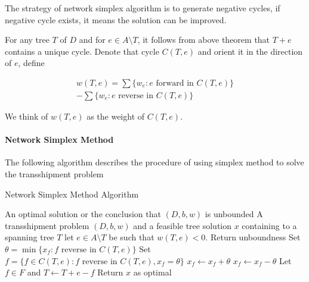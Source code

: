                 The strategy of network simplex algorithm is to generate negative cycles, if negative cycle exists, it means the solution can be improved.

                For any tree $T$ of $D$ and for $e\in A\setminus T$, it follows from above theorem that $T+e$ contains a unique cycle. Denote that cycle $C(T, e)$ and orient it in the direction of $e$, define 

                \begin{eqnarray}
                    w(T, e) = \sum\{w_e: e \text{ forward in } C(T, e)\} \nonumber \\ 
                            - \sum\{w_e: e \text{ reverse in } C(T, e)\}
                \end{eqnarray}

                We think of $w(T, e)$ as the weight of $C(T,e)$.

                \paragraph{Network Simplex Method} The following algorithm describes the procedure of using simplex method to solve the transshipment problem

                    \begin{algorithm}[H]
                        \caption{Network Simplex Method Algorithm}
                        \begin{algorithmic}
                            \Ensure An optimal solution or the conclusion that $(D, b, w)$ is unbounded
                            \Require A transshipment problem $(D, b, w)$ and a feasible tree solution $x$ containing to a spanning tree $T$
                                \State let $e \in A \setminus T$ be such that $w(T, e) < 0$.
                                    \State Return unboundness
                                \Else
                                    \State Set $\theta = \min\{x_f: f \text{ reverse in } C(T, e)\}$
                                    \State Set $f = \{f\in C(T, e): f \text{ reverse in } C(T, e), x_f = \theta\}$
                                        \State $x_f \gets x_f + \theta$
                                    \Else
                                        \State $x_f \gets x_f - \theta$
                                    \EndIf
                                    \State Let $f \in F$ and $T \gets T+e-f$
                                \EndIf
                            \EndWhile
                            \State Return $x$ as optimal
                        \end{algorithmic}
                    \end{algorithm}

